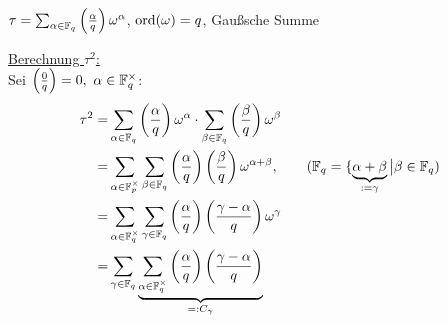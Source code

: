\documentclass[a4paper,DIV15,BCOR12mm]{article}
\begin{document}
$\tau = \sum_{\alpha \in
\mathbb{F}_q}\left(\frac{\alpha}{q}\right)\omega^\alpha$, $\mathop{\rm ord}\nolimits(\omega) =
q$, Gaußsche Summe

\underline{Berechnung $\tau^2$:}\\
Sei $\left(\frac{0}{q}\right) = 0,\ \alpha \in \mathbb{F}_q^\times$:
\begin{align*}
\tau^2 = &\sum_{\alpha \in \mathbb{F}_q}\left(\frac{\alpha}{q}\right)\omega^\alpha \cdot \sum_{\beta \in \mathbb{F}_q}\left(\frac{\beta}{q}\right)\omega^\beta \\
=& \sum_{\alpha \in \mathbb{F}_p^\times} \sum_{\beta \in \mathbb{F}_q}\left(\frac{\alpha}{q}\right)\left(\frac{\beta}{q}\right)\omega^{\alpha + \beta},\qquad   (\mathbb{F}_q = \{\underbrace{\alpha + \beta}_{:= \gamma} \big| \beta \in \mathbb{F}_q) \\
=& \sum_{\alpha \in \mathbb{F}_q^\times} \sum_{\gamma \in \mathbb{F}_q} \left(\frac{\alpha}{q}\right)\left(\frac{\gamma - \alpha}{q}\right)\omega^\gamma  \\
=& \sum_{\gamma \in \mathbb{F}_q} \underbrace{\sum_{\alpha \in \mathbb{F}_q^\times} \left(\frac{\alpha}{q}\right)\left(\frac{\gamma - \alpha}{q}\right)}_{=: C_\gamma}  \\
\end{align*}
\end{document}
